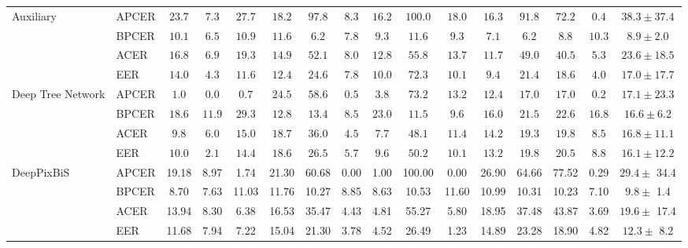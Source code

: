 \documentclass[journal]{IEEEtran}
\begin{document}
\begin{table*}[ht!]
{{\begin{tabular}{l|l|c|c|c|c|c|c|c|c|c|c|c|c|c|c}
    \multirow{4}{*}{Auxiliary \cite{liu2018learning} }
     & APCER &$23.7$& $7.3$ & $27.7$ & $18.2$ & $97.8$ & $8.3$ & $16.2$ & $100.0$ & $18.0$ & $16.3$ & $91.8$ & $72.2$ & $0.4$ & $38.3\pm37.4$  \\ \cline{3-16}
     & BPCER &$10.1$& $6.5$ & $10.9$ & $11.6$ & $6.2$ & $7.8$ & $9.3$ & $11.6$ & $9.3$ & $7.1$ & $6.2$ & $8.8$ & $10.3$ & $8.9\pm2.0$  \\ \cline{3-16}
     & ACER &$16.8$& $6.9$ & $19.3$ & $14.9$ & $52.1$ & $8.0$ & $12.8$ & $55.8$ & $13.7$ & $11.7$ & $49.0$ & $40.5$ & $5.3$ &$23.6\pm18.5$  \\ \cline{3-16}
     & EER &$14.0$& $4.3$ & $11.6$ & $12.4$ & $24.6$ & $7.8$ & $10.0$ & $72.3$ & $10.1$ & $9.4$ & $21.4$ & $18.6$ & $4.0$  & $17.0\pm17.7$ \\ \midrule

    \multirow{4}{*}{Deep Tree Network \cite{Liu_2019_CVPR}}

     & APCER &$1.0$& $0.0$ & $0.7$ & $24.5$ & $58.6$ & $0.5$ & $3.8$ & $73.2$ & $13.2$ & $12.4$ & $17.0$ & $17.0$ & $0.2$ & $17.1\pm23.3$  \\ \cline{3-16}
     & BPCER &$18.6$& $11.9$ & $29.3$ & $12.8$ & $13.4$ & $8.5$ & $23.0$ & $11.5$ & $9.6$ & $16.0$ & $21.5$ & $22.6$ & $16.8$ & $16.6\pm6.2$  \\ \cline{3-16}
     & ACER &$9.8$& $6.0$ & $15.0$ & $18.7$ & $36.0$ & $4.5$ & $7.7$ & $48.1$ & $11.4$ & $14.2$ & $19.3$ & $19.8$ & $8.5$ & $16.8\pm11.1$  \\ \cline{3-16}
     & EER &$10.0$& $2.1$ & $14.4$ & $18.6$ & $26.5$ & $5.7$ & $9.6$ & $50.2$ & $10.1$ & $13.2$ & $19.8$ & $20.5$ & $8.8$ & $16.1\pm12.2$   \\ \midrule

    \multirow{4}{*}{DeepPixBiS \cite{george2019deep}}

    & APCER & 19.18 & 8.97 &  1.74 &   21.30 &   60.68 &   0.00 &  1.00 &    100.00 &     0.00 &    26.90 &    64.66 &   77.52 &  0.29 & $ 29.4 \pm $ 34.4 \\ \cline{3-16}
	& BPCER &  8.70 & 7.63 & 11.03 &   11.76 &   10.27 &   8.85 &  8.63 &     10.53 &    11.60 &    10.99 &    10.31 &   10.23 &  7.10 & $  9.8 \pm $  1.4 \\ \cline{3-16}
	& ACER  & 13.94 & 8.30 &  6.38 &   16.53 &   35.47 &   4.43 &  4.81 &     55.27 &     5.80 &    18.95 &    37.48 &   43.87 &  3.69 & $ 19.6 \pm $ 17.4 \\ \cline{3-16}
	& EER   & 11.68 & 7.94 &  7.22 &   15.04 &   21.30 &   3.78 &  4.52 &     26.49 &     1.23 &    14.89 &    23.28 &   18.90 &  4.82 & $ 12.3 \pm $  8.2 \\ \midrule


\end{tabular}}}
\end{table*}
\end{document}
